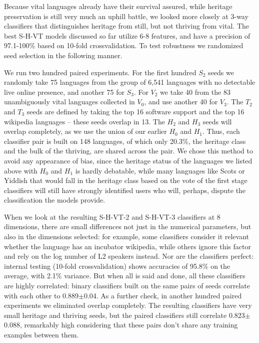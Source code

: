 \documentclass[10pt]{article}
\begin{document}
Because vital languages already have their survival assured, while heritage
preservation is still very much an uphill battle, we looked more closely at
3-way classifiers that distinguishes heritage from still, but not thriving
from vital. The best S-H-VT models discussed so far utilize 6-8 features,
and have a precision of 97.1-100\% based on 10-fold crossvalidation. To test
robustness we randomized seed selection in the following manner.

We run two hundred paired experiments. For the first hundred $S_2$ seeds we
randomly take 75 languages from the group of 6,541 languages with no
detectable live online presence, and another 75 for $S_3.$ For $V_2$ we take
40 from the 83 unambiguously vital languages collected in $V_0$, and use
another 40 for $V_3$. The $T_2$ and $T_3$ seeds are defined by taking the top
16 software support and the top 16 wikipedia languages -- these seeds overlap
in 13. The $H_2$ and $H_3$ seeds will overlap completely, as we use the union
of our earlier $H_0$ and $H_1$. Thus, each classifier pair is built on 148
languages, of which only 20.3\%, the heritage class and the bulk of the
thriving, are shared across the pair. We chose this method to avoid any
appearance of bias, since the heritage status of the languages we listed above
with $H_0$ and $H_1$ is hardly debatable, while many languages like Scots or
Yiddish that would fall in the heritage class based on the vote of the first
stage classifiers will still have strongly identified users who will, perhaps,
dispute the classification the models provide.

When we look at the resulting S-H-VT-2 and S-H-VT-3 classifiers at 8
dimensions, there are small differences not just in the numerical parameters,
but also in the dimensions selected: for example, some classifiers consider it
relevant whether the language has an incubator wikipedia, while others ignore
this factor and rely on the log number of L2 speakers instead. Nor are the
classifiers perfect: internal testing (10-fold crossvalidation) shows
accuracies of 95.8\% on the average, with 2.1\% variance. But when all is said
and done, all these classifiers are highly correlated: binary classifiers
built on the same pairs of seeds correlate with each other to 0.889$\pm$0.04.
As a further check, in another hundred paired experiments we eliminated
overlap completely. The resulting classifiers have very small heritage and 
thriving seeds, but the paired classifiers still correlate 0.823$\pm$0.088,
remarkably high considering that these pairs don't share any training examples
between them.
\end{document}
